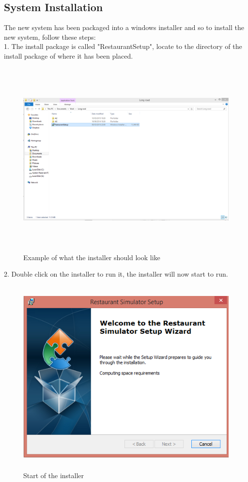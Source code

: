 \subsection{System Installation}
\begin{landscape}
The new system has been packaged into a windows installer and so to install the new system, follow these steps: \\

1. The install package is called "RestaurantSetup", locate to the directory of the install package of where it has been placed. 


\begin{figure}[H]
    \includegraphics[height = 10cm]{./Manual/images/install1} 
    \caption{Example of what the installer should look like} \label{fig:install1}
\end{figure}



2. Double click on the installer to run it, the installer will now start to run.

\begin{figure}[H]
    \includegraphics[height = 10cm]{./Manual/images/install2} 
    \caption{Start of the installer} \label{fig:install2}
\end{figure}


\end{landscape}
